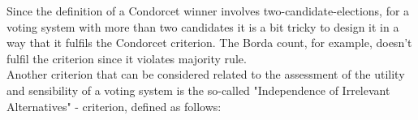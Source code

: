 Since the definition of a Condorcet winner involves two-candidate-elections, for a voting system with more than two candidates it is a bit tricky to design it in a way that it fulfils the Condorcet criterion. The Borda count, for example, doesn't fulfil the criterion since it violates majority rule. \\
Another criterion that can be considered related to the assessment of the utility and sensibility of a voting system is the so-called "Independence of Irrelevant Alternatives" - criterion, defined as follows: \\
